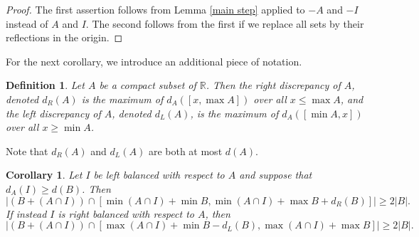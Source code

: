 \documentclass[11pt,reqno]{amsart}
\newtheorem{corollary}[theorem]{Corollary}
\newtheorem{definition}[theorem]{Definition}
\theoremstyle{definition}
\def\R{\mathbb{R}}
\begin{document}
\begin{proof}
The first assertion follows from Lemma \ref{main step} applied to $-A$ and $-I$ instead of $A$ and $I$. The second follows from the first if we replace all sets by their reflections in the origin.
\end{proof}

For the next corollary, we introduce an additional piece of notation.

\begin{definition} \label{edge discrepancy}
Let $A$ be a compact subset of $\R$. Then the \emph{right discrepancy} of $A$, denoted $d_R(A)$ is the maximum of $d_A([x,\max A])$ over all $x\leq\max A$, and the \emph{left discrepancy} of $A$, denoted $d_L(A)$, is the maximum of $d_A([\min A,x])$ over all $x\geq\min A$.
\end{definition}

Note that $d_R(A)$ and $d_L(A)$ are both at most $d(A)$.

\begin{corollary} \label{key bound}
Let $I$ be left balanced with respect to $A$ and suppose that $d_A(I)\geq d(B)$. Then 
\[\big|(B+(A\cap I))\cap[\min(A\cap I)+\min B,\min(A\cap I)+\max B+d_R(B)]\big|\geq 2|B|.\]
If instead $I$ is right balanced with respect to $A$, then
\[\big|(B+(A\cap I))\cap[\max(A\cap I)+\min B-d_L(B),\max(A\cap I)+\max B]\big|\geq 2|B|.\] 
\end{corollary}
\end{document}
